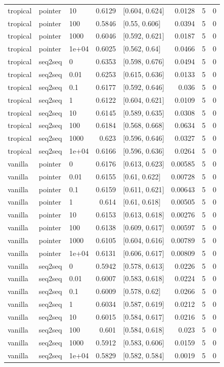 \documentclass[10pt]{article}
\begin{document}
{\begin{longtable}{lllrlrrr}
tropical & pointer & 10 & 0.6129 & [0.604, 0.624] & 0.0128 & 5 & 0\\
tropical & pointer & 100 & 0.5846 & [0.55, 0.606] & 0.0394 & 5 & 0\\
tropical & pointer & 1000 & 0.6046 & [0.592, 0.621] & 0.0187 & 5 & 0\\
tropical & pointer & 1e+04 & 0.6025 & [0.562, 0.64] & 0.0466 & 5 & 0\\
tropical & seq2seq & 0 & 0.6353 & [0.598, 0.676] & 0.0494 & 5 & 0\\
tropical & seq2seq & 0.01 & 0.6253 & [0.615, 0.636] & 0.0133 & 5 & 0\\
tropical & seq2seq & 0.1 & 0.6177 & [0.592, 0.646] & 0.036 & 5 & 0\\
tropical & seq2seq & 1 & 0.6122 & [0.604, 0.621] & 0.0109 & 5 & 0\\
tropical & seq2seq & 10 & 0.6145 & [0.589, 0.635] & 0.0308 & 5 & 0\\
tropical & seq2seq & 100 & 0.6184 & [0.568, 0.668] & 0.0634 & 5 & 0\\
tropical & seq2seq & 1000 & 0.623 & [0.596, 0.646] & 0.0327 & 5 & 0\\
tropical & seq2seq & 1e+04 & 0.6166 & [0.596, 0.636] & 0.0264 & 5 & 0\\
vanilla & pointer & 0 & 0.6176 & [0.613, 0.623] & 0.00585 & 5 & 0\\
vanilla & pointer & 0.01 & 0.6155 & [0.61, 0.622] & 0.00728 & 5 & 0\\
vanilla & pointer & 0.1 & 0.6159 & [0.611, 0.621] & 0.00643 & 5 & 0\\
vanilla & pointer & 1 & 0.614 & [0.61, 0.618] & 0.00505 & 5 & 0\\
vanilla & pointer & 10 & 0.6153 & [0.613, 0.618] & 0.00276 & 5 & 0\\
vanilla & pointer & 100 & 0.6138 & [0.609, 0.617] & 0.00597 & 5 & 0\\
vanilla & pointer & 1000 & 0.6105 & [0.604, 0.616] & 0.00789 & 5 & 0\\
vanilla & pointer & 1e+04 & 0.6131 & [0.606, 0.617] & 0.00809 & 5 & 0\\
vanilla & seq2seq & 0 & 0.5942 & [0.578, 0.613] & 0.0226 & 5 & 0\\
vanilla & seq2seq & 0.01 & 0.6007 & [0.583, 0.618] & 0.0224 & 5 & 0\\
vanilla & seq2seq & 0.1 & 0.6009 & [0.578, 0.62] & 0.0266 & 5 & 0\\
vanilla & seq2seq & 1 & 0.6034 & [0.587, 0.619] & 0.0212 & 5 & 0\\
vanilla & seq2seq & 10 & 0.6015 & [0.584, 0.617] & 0.0216 & 5 & 0\\
vanilla & seq2seq & 100 & 0.601 & [0.584, 0.618] & 0.023 & 5 & 0\\
vanilla & seq2seq & 1000 & 0.5912 & [0.583, 0.606] & 0.0159 & 5 & 0\\
vanilla & seq2seq & 1e+04 & 0.5829 & [0.582, 0.584] & 0.0019 & 5 & 0\\
\bottomrule
\end{longtable}
}
\end{document}
